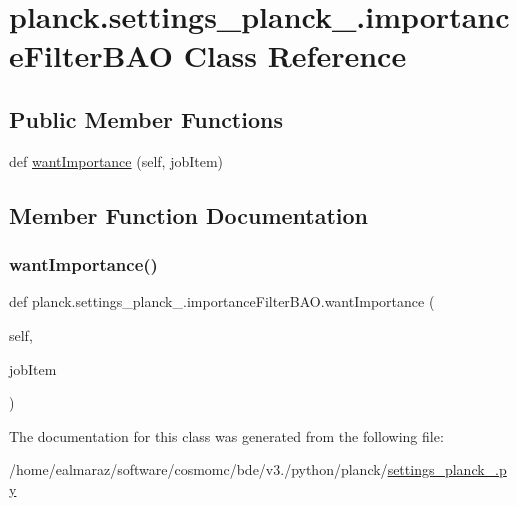 \hypertarget{classplanck_1_1settings__planck__2015_1_1importanceFilterBAO}{}\section{planck.\+settings\+\_\+planck\+\_.\+importance\+Filter\+B\+AO Class Reference}
\label{classplanck_1_1settings__planck__2015_1_1importanceFilterBAO}
\subsection*{Public Member Functions}
\begin{DoxyCompactItemize}
\item 
def \mbox{\hyperlink{classplanck_1_1settings__planck__2015_1_1importanceFilterBAO_affe478781e46803069b0dd70b5f12d44}{want\+Importance}} (self, job\+Item)
\end{DoxyCompactItemize}


\subsection{Member Function Documentation}
\mbox{\label{classplanck_1_1settings__planck__2015_1_1importanceFilterBAO_affe478781e46803069b0dd70b5f12d44}} 
\subsubsection{\texorpdfstring{want\+Importance()}{wantImportance()}}
{\footnotesize\ttfamily def planck.\+settings\+\_\+planck\+\_.\+importance\+Filter\+B\+A\+O.\+want\+Importance (\begin{DoxyParamCaption}\item[{}]{self,  }\item[{}]{job\+Item }\end{DoxyParamCaption})}



The documentation for this class was generated from the following file\+:\begin{DoxyCompactItemize}
\item 
/home/ealmaraz/software/cosmomc/bde/v3./python/planck/\mbox{\hyperlink{settings__planck__2015_8py}{settings\+\_\+planck\+\_.\+py}}\end{DoxyCompactItemize}
